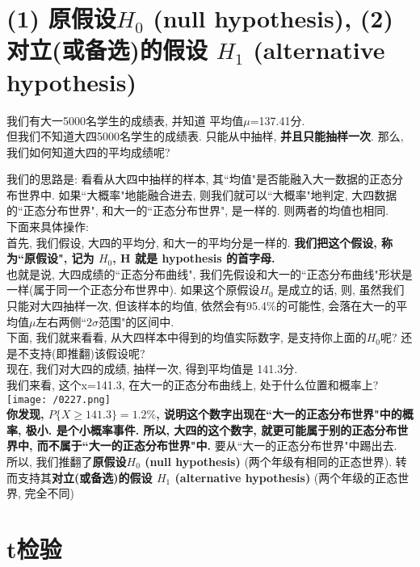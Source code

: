 \documentclass[UTF8]{ctexart}
\begin{document}
	
	
	
	
	
	\section{(1) 原假设$H_0$ (null hypothesis), (2) 对立(或备选)的假设 $H_1$ (alternative hypothesis)}
	
	\begin{myEnvSample}
		我们有大一5000名学生的成绩表, 并知道 平均值$\mu$=137.41分. \\
		但我们不知道大四5000名学生的成绩表. 只能从中抽样, \textbf{并且只能抽样一次}. 那么, 我们如何知道大四的平均成绩呢?
		
		我们的思路是: 看看从大四中抽样的样本, 其``均值"是否能融入大一数据的正态分布世界中. 如果``大概率"地能融合进去, 则我们就可以``大概率"地判定, 大四数据的``正态分布世界", 和大一的``正态分布世界", 是一样的. 则两者的均值也相同. \\
		
		下面来具体操作: \\
		首先, 我们假设, 大四的平均分, 和大一的平均分是一样的. \textbf{我们把这个假设, 称为``原假设", 记为 $H_0$,  H 就是 hypothesis 的首字母.} \\
		
		也就是说, 大四成绩的``正态分布曲线", 我们先假设和大一的``正态分布曲线"形状是一样(属于同一个正态分布世界中). 如果这个原假设$H_0$ 是成立的话, 则, 虽然我们只能对大四抽样一次, 但该样本的均值, 依然会有95.4\%的可能性, 会落在大一的平均值$\mu$左右两侧``$2 \sigma$范围"的区间中. \\
		
		下面, 我们就来看看, 从大四样本中得到的均值实际数字, 是支持你上面的$H_0$呢? 还是不支持(即推翻)该假设呢? \\
		
		现在, 我们对大四的成绩, 抽样一次, 得到平均值是 141.3分. \\
		我们来看, 这个x=141.3, 在大一的正态分布曲线上, 处于什么位置和概率上? \\
		
		\texttt{[image: /0227.png]} \\
		
		\textbf{你发现, $P\{X\ge 141.3\}=1.2\%$, 说明这个数字出现在``大一的正态分布世界"中的概率, 极小. 是个小概率事件. 所以, 大四的这个数字, 就更可能属于别的正态分布世界中, 而不属于``大一的正态分布世界"中.} 要从``大一的正态分布世界"中踢出去. \\
		
		所以, 我们推翻了\textbf{原假设$H_0$ (null hypothesis)} (两个年级有相同的正态世界). 转而支持其\textbf{对立(或备选)的假设 $H_1$ (alternative hypothesis)} (两个年级的正态世界, 完全不同)
	\end{myEnvSample}
	
	
	
	
	
	
	\section{t检验}
	
	\begin{myEnvSample}
		
	\end{myEnvSample}
	
	
	
	
	
\end{document}
